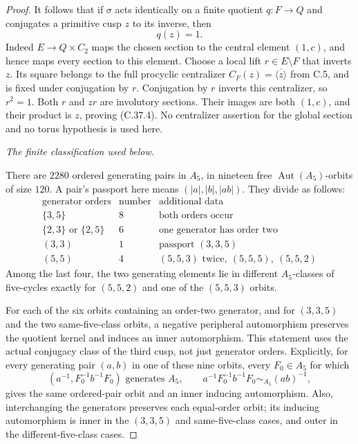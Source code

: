 \begin{proof}
It follows that if \(\sigma\) acts identically on a finite
quotient \(q:F\to Q\) and conjugates a primitive cusp \(z\)
to its inverse, then
\[
                              q(z)=1.
 \tag{C.37.4}
\]
Indeed \(E\to Q\times C_2\) maps the chosen section to
the central element \((1,c)\), and hence maps every section
to this element. Choose a local lift \(r\in E\setminus F\)
that inverts \(z\). Its square belongs to the full procyclic
centralizer \(C_F(z)=\overline{\langle z\rangle}\) from
C.5, and is fixed under conjugation by \(r\). Conjugation by
\(r\) inverts this centralizer, so \(r^2=1\).
Both \(r\) and \(zr\) are involutory sections. Their
images are both \((1,c)\), and their product is \(z\),
proving (C.37.4). No centralizer assertion for the global
section and no torus hypothesis is used here.

\emph{The finite classification used below.}\par
There are \(2280\) ordered generating pairs in \(A_5\),
in nineteen free \(\operatorname{Aut}(A_5)\)-orbits of
size \(120\). A pair's passport here means
\((|a|,|b|,|ab|)\). They divide as follows:
\[
\begin{array}{c|c|l}
\text{generator orders}&\text{number}&\text{additional data}\\ \hline
\{3,5\}&8&\text{both orders occur}\\
\{2,3\}\text{ or }\{2,5\}&6&\text{one generator has order two}\\
(3,3)&1&\text{passport }(3,3,5)\\
(5,5)&4& (5,5,3)\text{ twice},\ (5,5,5),\ (5,5,2)
\end{array}
\tag{C.37.5}
\]
Among the last four, the two generating elements lie in different
\(A_5\)-classes of five-cycles exactly for \((5,5,2)\)
and one of the \((5,5,3)\) orbits.

For each of the six orbits containing an order-two generator,
and for \((3,3,5)\) and the two same-five-class orbits,
a negative peripheral automorphism preserves the quotient
kernel and induces an inner automorphism. This statement uses
the actual conjugacy class of the third cusp, not just generator
orders. Explicitly, for every generating pair \((a,b)\)
in one of these nine orbits, every \(F_0\in A_5\) for
which
\[
 (a^{-1},F_0^{-1}b^{-1}F_0)\text{ generates }A_5,
 \qquad
 a^{-1}F_0^{-1}b^{-1}F_0\sim_{A_5}(ab)^{-1},
 \tag{C.37.6}
\]
gives the same ordered-pair orbit and an inner inducing
automorphism. Also, interchanging the generators preserves
each equal-order orbit; its inducing automorphism is inner
in the \((3,3,5)\) and same-five-class cases, and outer in
the different-five-class cases.


\end{proof}
